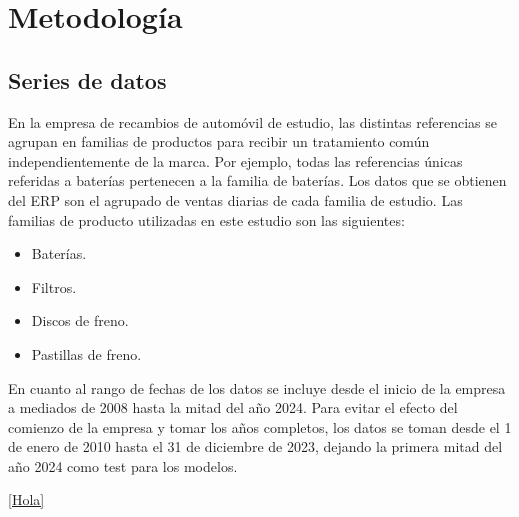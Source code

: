\chapter{Metodología}\label{cap3}

\section{Series de datos}

En la empresa de recambios de automóvil de estudio, las distintas referencias se agrupan en familias de productos para recibir un tratamiento común independientemente de la marca. Por ejemplo, todas las referencias únicas referidas a baterías pertenecen a la familia de baterías. Los datos que se obtienen del ERP son el agrupado de ventas diarias de cada familia de estudio. Las familias de producto utilizadas en este estudio son las siguientes:

\begin{itemize}
    \item Baterías.
    \item Filtros.
    \item Discos de freno.
    \item Pastillas de freno.
\end{itemize} 

En cuanto al rango de fechas de los datos se incluye desde el inicio de la empresa a mediados de 2008 hasta la mitad del año 2024. Para evitar el efecto del comienzo de la empresa y tomar los años completos, los datos se toman desde el 1 de enero de 2010 hasta el 31 de diciembre de 2023, dejando la primera mitad del año 2024 como test para los modelos.

\ref{Hola}

\label{Hola}
